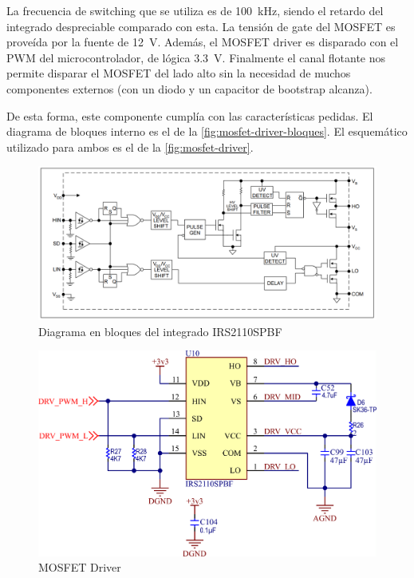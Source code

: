 \documentclass[titlepage, 12pt]{article}
\begin{document}
La frecuencia de switching que se utiliza es de \SI{100}{kHz}, siendo el retardo del integrado despreciable comparado con esta. La tensión de gate del MOSFET es proveída por la fuente de \SI{12}{V}. Además, el MOSFET driver es disparado con el PWM del microcontrolador, de lógica \SI{3.3}{V}. Finalmente el canal flotante nos permite disparar el MOSFET del lado alto sin la necesidad de muchos componentes externos (con un diodo y un capacitor de bootstrap alcanza).

De esta forma, este componente cumplía con las características pedidas. El diagrama de bloques interno es el de la \autoref{fig:mosfet-driver-bloques}. El esquemático utilizado para ambos es el de la \autoref{fig:mosfet-driver}.

    \begin{figure}[!htbp]
        \centering
        \includegraphics[scale=0.4]{images/mosfet-driver-bloques.png}
        \caption{Diagrama en bloques del integrado IRS2110SPBF}
        \label{fig:mosfet-driver-bloques}
    \end{figure}

    \begin{figure}[!htbp]
        \centering
        \includegraphics[scale=1.5]{images/mosfet-driver.png}
        \caption{MOSFET Driver}
        \label{fig:mosfet-driver}
    \end{figure}
\end{document}
